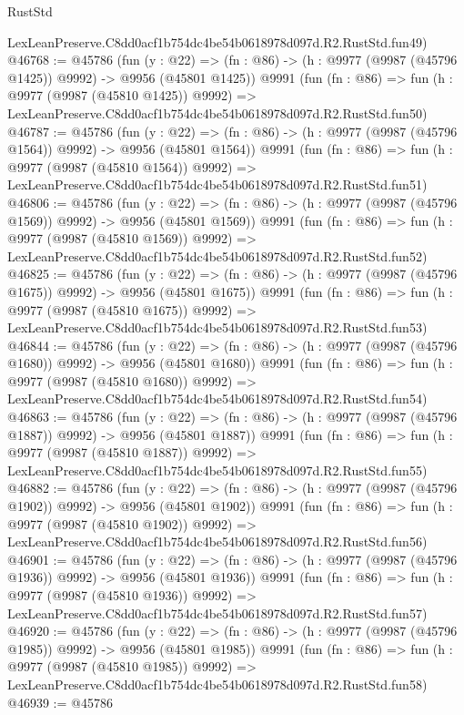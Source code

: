 \begin{lexlean}{RustStd}
\begin{coremodule}
    LexLeanPreserve.C8dd0acf1b754dc4be54b0618978d097d.R2.RustStd.fun49)
@46768 := @45786
    (fun (y : @22) =>
    (fn : @86) -> (h : @9977 (@9987 (@45796 @1425)) @9992) -> @9956 (@45801 @1425))
    @9991
    (fun (fn : @86) =>
    fun (h : @9977 (@9987 (@45810 @1425)) @9992) =>
    LexLeanPreserve.C8dd0acf1b754dc4be54b0618978d097d.R2.RustStd.fun50)
@46787 := @45786
    (fun (y : @22) =>
    (fn : @86) -> (h : @9977 (@9987 (@45796 @1564)) @9992) -> @9956 (@45801 @1564))
    @9991
    (fun (fn : @86) =>
    fun (h : @9977 (@9987 (@45810 @1564)) @9992) =>
    LexLeanPreserve.C8dd0acf1b754dc4be54b0618978d097d.R2.RustStd.fun51)
@46806 := @45786
    (fun (y : @22) =>
    (fn : @86) -> (h : @9977 (@9987 (@45796 @1569)) @9992) -> @9956 (@45801 @1569))
    @9991
    (fun (fn : @86) =>
    fun (h : @9977 (@9987 (@45810 @1569)) @9992) =>
    LexLeanPreserve.C8dd0acf1b754dc4be54b0618978d097d.R2.RustStd.fun52)
@46825 := @45786
    (fun (y : @22) =>
    (fn : @86) -> (h : @9977 (@9987 (@45796 @1675)) @9992) -> @9956 (@45801 @1675))
    @9991
    (fun (fn : @86) =>
    fun (h : @9977 (@9987 (@45810 @1675)) @9992) =>
    LexLeanPreserve.C8dd0acf1b754dc4be54b0618978d097d.R2.RustStd.fun53)
@46844 := @45786
    (fun (y : @22) =>
    (fn : @86) -> (h : @9977 (@9987 (@45796 @1680)) @9992) -> @9956 (@45801 @1680))
    @9991
    (fun (fn : @86) =>
    fun (h : @9977 (@9987 (@45810 @1680)) @9992) =>
    LexLeanPreserve.C8dd0acf1b754dc4be54b0618978d097d.R2.RustStd.fun54)
@46863 := @45786
    (fun (y : @22) =>
    (fn : @86) -> (h : @9977 (@9987 (@45796 @1887)) @9992) -> @9956 (@45801 @1887))
    @9991
    (fun (fn : @86) =>
    fun (h : @9977 (@9987 (@45810 @1887)) @9992) =>
    LexLeanPreserve.C8dd0acf1b754dc4be54b0618978d097d.R2.RustStd.fun55)
@46882 := @45786
    (fun (y : @22) =>
    (fn : @86) -> (h : @9977 (@9987 (@45796 @1902)) @9992) -> @9956 (@45801 @1902))
    @9991
    (fun (fn : @86) =>
    fun (h : @9977 (@9987 (@45810 @1902)) @9992) =>
    LexLeanPreserve.C8dd0acf1b754dc4be54b0618978d097d.R2.RustStd.fun56)
@46901 := @45786
    (fun (y : @22) =>
    (fn : @86) -> (h : @9977 (@9987 (@45796 @1936)) @9992) -> @9956 (@45801 @1936))
    @9991
    (fun (fn : @86) =>
    fun (h : @9977 (@9987 (@45810 @1936)) @9992) =>
    LexLeanPreserve.C8dd0acf1b754dc4be54b0618978d097d.R2.RustStd.fun57)
@46920 := @45786
    (fun (y : @22) =>
    (fn : @86) -> (h : @9977 (@9987 (@45796 @1985)) @9992) -> @9956 (@45801 @1985))
    @9991
    (fun (fn : @86) =>
    fun (h : @9977 (@9987 (@45810 @1985)) @9992) =>
    LexLeanPreserve.C8dd0acf1b754dc4be54b0618978d097d.R2.RustStd.fun58)
@46939 := @45786

\end{coremodule}
\end{lexlean}
